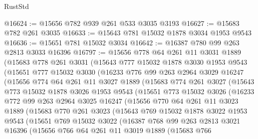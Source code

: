 \begin{lexlean}{RustStd}
\begin{coremodule}
@16624 := @15656 @782 @939 @261 @533 @3035 @3193
@16627 := @15683 @782 @261 @3035
@16633 := @15643 @781 @15032 @1878 @3034 @1953 @9543
@16636 := @15651 @781 @15032 @3034
@16642 := @16387 @780 @99 @263 @2813 @3033 @16396
@16797 := @15656
    @778
    @64
    @261
    @11
    @3031
    @1889
    (@15683
      @778
      @261
      @3031
      (@15643
        @777
        @15032
        @1878
        @3030
        @1953
        @9543
        (@15651
          @777
          @15032
          @3030
          (@16233
            @776
            @99
            @263
            @2964
            @3029
            @16247
            (@15656
              @774
              @64
              @261
              @11
              @3027
              @1889
              (@15683
                @774
                @261
                @3027
                (@15643
                  @773
                  @15032
                  @1878
                  @3026
                  @1953
                  @9543
                  (@15651
                    @773
                    @15032
                    @3026
                    (@16233
                      @772
                      @99
                      @263
                      @2964
                      @3025
                      @16247
                      (@15656
                        @770
                        @64
                        @261
                        @11
                        @3023
                        @1889
                        (@15683
                          @770
                          @261
                          @3023
                          (@15643
                            @769
                            @15032
                            @1878
                            @3022
                            @1953
                            @9543
                            (@15651
                              @769
                              @15032
                              @3022
                              (@16387
                                @768
                                @99
                                @263
                                @2813
                                @3021
                                @16396
                                (@15656
                                  @766
                                  @64
                                  @261
                                  @11
                                  @3019
                                  @1889
                                  (@15683
                                    @766

\end{coremodule}
\end{lexlean}
